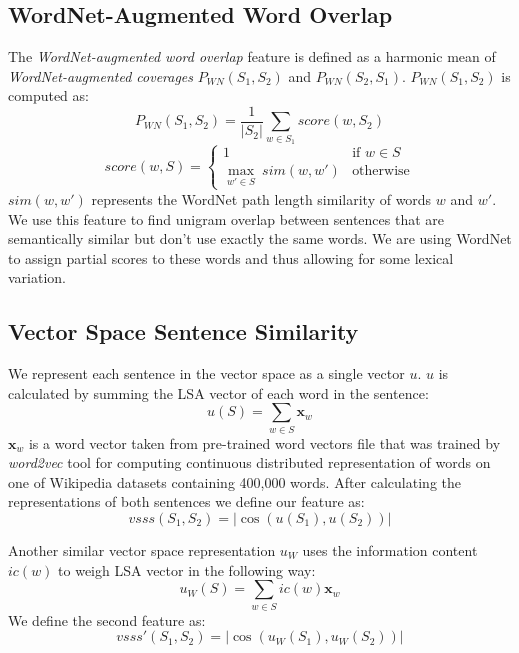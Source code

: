 \documentclass[10pt, a4paper]{article}
\begin{document}
\subsection{WordNet-Augmented Word Overlap}
The \textit{WordNet-augmented word overlap} feature is defined as a harmonic mean of \textit{WordNet-augmented coverages} $P_{WN}(S_1, S_2)$ and $P_{WN}(S_2, S_1)$. $P_{WN}(S_1, S_2)$ is computed as:
\begin{equation}
P_{WN}(S_1, S_2) = \dfrac{1}{|S_2|}\sum_{w \in S_1}score(w, S_2)
\end{equation}
\begin{equation}
score(w, S) = \left\{
\begin{array}{ll}
1 & \mbox{if } w \in S \\
\underset{w' \in S}{\max} \: sim(w, w') & \mbox{otherwise}
\end{array}
\right.
\end{equation}
$sim(w, w')$ represents the WordNet path length similarity of words $w$ and $w'$. We use this feature to find unigram overlap between sentences that are semantically similar but don't use exactly the same words. We are using WordNet to assign partial scores to these words and thus allowing for some lexical variation.

\subsection{Vector Space Sentence Similarity}
We represent each sentence in the vector space as a single vector $u$. $u$ is calculated by summing the LSA vector of each word in the sentence:
\begin{equation}
u(S) = \sum_{w \in S} \textbf{x}_w
\end{equation}
$\textbf{x}_w$ is a word vector taken from pre-trained word vectors file that was trained by \textit{word2vec} tool for computing continuous distributed representation of words \citep{google_word2vec_web} on one of Wikipedia datasets containing 400,000 words. After calculating the representations of both sentences we define our feature as:
\begin{equation}
vsss(S_1, S_2) = |\cos(u(S_1), u(S_2))|
\end{equation}

Another similar vector space representation $u_W$ uses the information content $ic(w)$ to weigh LSA vector in the following way:
\begin{equation}
u_W(S) = \sum_{w \in S} ic(w)\textbf{x}_w
\end{equation}
We define the second feature as:
\begin{equation}
vsss'(S_1, S_2) = |\cos(u_W(S_1), u_W(S_2))|
\end{equation}
\end{document}
